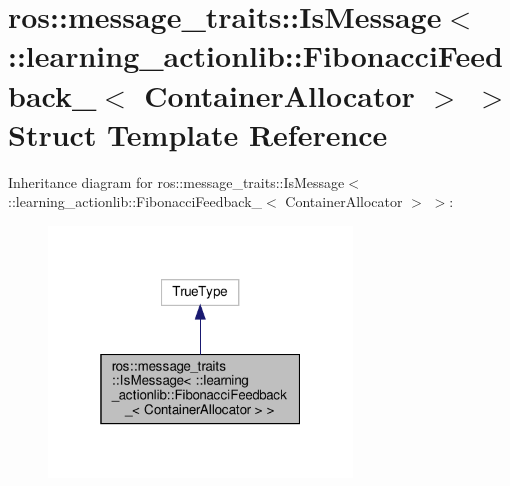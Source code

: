 \hypertarget{structros_1_1message__traits_1_1IsMessage_3_01_1_1learning__actionlib_1_1FibonacciFeedback___3_01ContainerAllocator_01_4_01_4}{}\section{ros\+:\+:message\+\_\+traits\+:\+:Is\+Message$<$ \+:\+:learning\+\_\+actionlib\+:\+:Fibonacci\+Feedback\+\_\+$<$ Container\+Allocator $>$ $>$ Struct Template Reference}
\label{structros_1_1message__traits_1_1IsMessage_3_01_1_1learning__actionlib_1_1FibonacciFeedback___3_01ContainerAllocator_01_4_01_4}


Inheritance diagram for ros\+:\+:message\+\_\+traits\+:\+:Is\+Message$<$ \+:\+:learning\+\_\+actionlib\+:\+:Fibonacci\+Feedback\+\_\+$<$ Container\+Allocator $>$ $>$\+:
\nopagebreak
\begin{figure}[H]
\begin{center}
\leavevmode
\includegraphics[width=229pt]{structros_1_1message__traits_1_1IsMessage_3_01_1_1learning__actionlib_1_1FibonacciFeedback___3_0effcf51a1d7cc70609039c72755ea149}
\end{center}
\end{figure}


